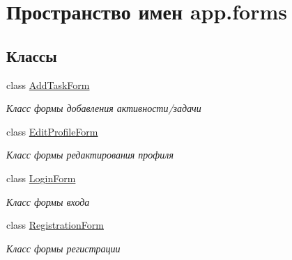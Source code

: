 \hypertarget{namespaceapp_1_1forms}{}\section{Пространство имен app.\+forms}
\label{namespaceapp_1_1forms}
\subsection*{Классы}
\begin{DoxyCompactItemize}
\item 
class \mbox{\hyperlink{classapp_1_1forms_1_1_add_task_form}{Add\+Task\+Form}}
\begin{DoxyCompactList}\small\item\em Класс формы добавления активности/задачи \end{DoxyCompactList}\item 
class \mbox{\hyperlink{classapp_1_1forms_1_1_edit_profile_form}{Edit\+Profile\+Form}}
\begin{DoxyCompactList}\small\item\em Класс формы редактирования профиля \end{DoxyCompactList}\item 
class \mbox{\hyperlink{classapp_1_1forms_1_1_login_form}{Login\+Form}}
\begin{DoxyCompactList}\small\item\em Класс формы входа \end{DoxyCompactList}\item 
class \mbox{\hyperlink{classapp_1_1forms_1_1_registration_form}{Registration\+Form}}
\begin{DoxyCompactList}\small\item\em Класс формы регистрации \end{DoxyCompactList}\end{DoxyCompactItemize}
